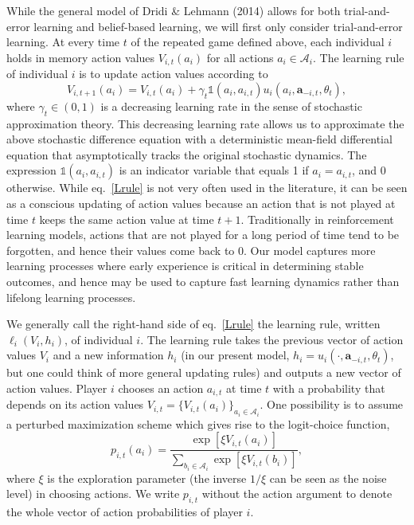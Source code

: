 \documentclass[11pt,reqno]{amsart}
\newcommand{\e}{\theta} %
\newcommand{\At}{V} %
\newcommand{\ac}{a} %
\newcommand{\Ac}{\mathcal{A}} %
\newcommand{\p}{p} %
\newcommand{\va}{\mathbf{a}} %
\newcommand{\iv}{\mathds{1}} %
\newcommand{\lr}{\gamma} %
\newcommand{\xr}{\xi} %
\newcommand{\tm}{t}%
\newcommand{\ru}{\ell} %
\newcommand{\pf}{u} %
\begin{document}
While the general model of Dridi \& Lehmann (2014) allows for both trial-and-error learning and belief-based learning, we will first only consider trial-and-error learning. At every time $\tm$ of the repeated game defined above, each individual $i$ holds in memory action values $\At_{i,\tm}(\ac_i)$ for all actions $\ac_i \in \Ac_i$. The learning rule of individual $i$ is to update action values according to
\begin{equation}
\label{Lrule}
\At_{i,\tm+1}(\ac_i) = \At_{i,\tm}(\ac_i) + \lr_\tm  \iv(\ac_i,\ac_{i,\tm}) \pf_{i}(\ac_i,\va_{-i,\tm},\e_\tm),
\end{equation} 
where $\lr_\tm \in (0,1)$ is a decreasing learning rate in the sense of stochastic approximation theory. This decreasing learning rate allows us to approximate the above stochastic difference equation with a deterministic mean-field differential equation that asymptotically tracks the original stochastic dynamics. The expression $\iv(\ac_i,\ac_{i,\tm})$ is an indicator variable that equals 1 if $\ac_i = \ac_{i,\tm}$, and 0 otherwise. While eq.~\ref{Lrule} is not very often used in the literature, it can be seen as a conscious updating of action values because an action that is not played at time $\tm$ keeps the same action value at time $\tm+1$. Traditionally in reinforcement learning models, actions that are not played for a long period of time tend to be forgotten, and hence their values come back to 0. Our model captures more learning processes where early experience is critical in determining stable outcomes, and hence may be used to capture fast learning dynamics rather than lifelong learning processes.

We generally call the right-hand side of eq.~\ref{Lrule} the learning rule, written $\ru_i(\At_{i}, h_i)$, of individual $i$. The learning rule takes the previous vector of action values $\At_{i}$ and a new information $h_i$ (in our present model, $h_i = \pf_{i}(\cdot,\va_{-i,\tm},\e_\tm)$, but one could think of more general updating rules) and outputs a new vector of action values. Player $i$ chooses an action $\ac_{i,\tm}$ at time $\tm$ with a probability that depends on its action values $\At_{i,\tm} = \{ \At_{i,\tm}(\ac_i) \}_{\ac_i\in\Ac_i}$. One possibility is to assume a perturbed maximization scheme which gives rise to the logit-choice function,
\begin{equation}
\label{logitchoice}
\p_{i,t}(\ac_i) = \frac{\exp[\xr \At_{i,t}(\ac_i)]}{\sum_{b_i\in \Ac_i} \exp[\xr \At_{i,t}(b_i)]},
\end{equation}
where $\xr$ is the exploration parameter (the inverse $1/\xr$ can be seen as the noise level) in choosing actions. We write $\p_{i,t}$ without the action argument to denote the whole vector of action probabilities of player $i$.
\end{document}
